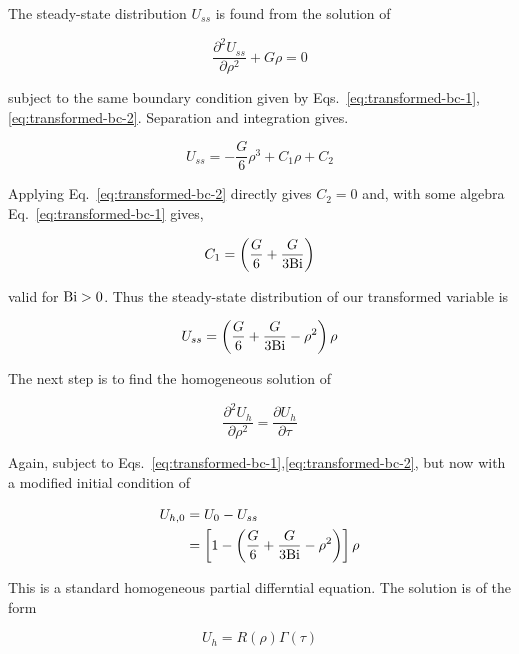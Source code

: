 The steady-state distribution $U_{ss}$ is found from the solution of

\begin{equation}
    \frac{\partial^2 U_{ss}}{\partial \rho^2} + G\rho= 0
\end{equation}

subject to the same boundary condition given by Eqs.~\ref{eq:transformed-bc-1},\ref{eq:transformed-bc-2}. Separation and integration gives.

\begin{equation}
    U_{ss} = -\frac{G}{6} \rho^3 + C_1\rho + C_2
\end{equation}

Applying Eq.~\ref{eq:transformed-bc-2} directly gives $C_2 = 0$ and, with some algebra Eq.~\ref{eq:transformed-bc-1} gives, 

\begin{equation*}
    C_1 = \left(\frac{G}{6} + \frac{G}{3\mathrm{Bi}}\right)
\end{equation*}

valid for $\mathrm{Bi} > 0$. Thus the steady-state distribution of our transformed variable is

\begin{equation}\label{eq:transformed-steady-state-solution}
    U_{ss} = \left(\frac{G}{6} + \frac{G}{3\mathrm{Bi}}-\rho^2\right)\rho
\end{equation}

The next step is to find the homogeneous solution of 

\begin{equation}
    \frac{\partial^2 U_h}{\partial \rho^2} = \frac{\partial U_h}{\partial \tau}
\end{equation}

Again, subject to Eqs.~\ref{eq:transformed-bc-1},\ref{eq:transformed-bc-2}, but now with a modified initial condition of 

\begin{align}\label{eq:homogeneous-ic}
    U_{h,0} &= U_0 - U_{ss} \nonumber \\
    & = \left[1 - \left(\frac{G}{6} + \frac{G}{3\mathrm{Bi}}-\rho^2\right) \right]\rho
\end{align}

This is a standard homogeneous partial differntial equation. The solution is of the form

\begin{equation}
    U_h = R(\rho) \Gamma(\tau)
\end{equation}

